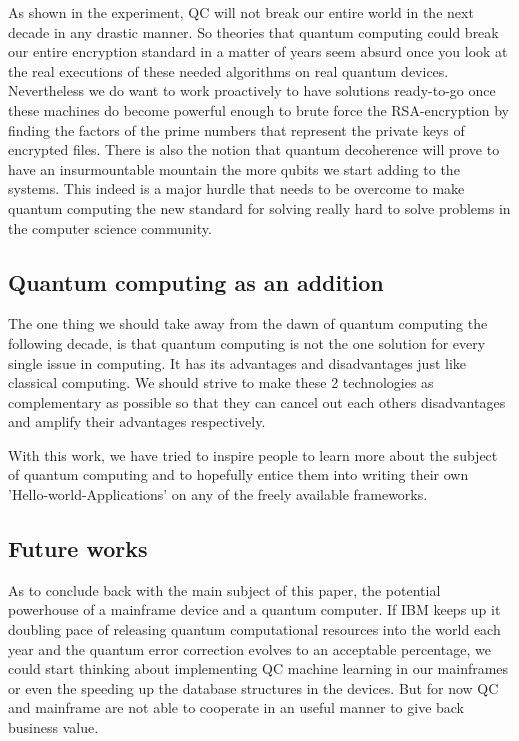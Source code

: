 As shown in the experiment, QC will not break our entire world in the next decade in any drastic manner. So theories that quantum computing could break our entire encryption standard in a matter of years seem absurd once you look at the real executions of these needed algorithms on real quantum devices.
Nevertheless we do want to work proactively to have solutions ready-to-go once these machines do become powerful enough to brute force the RSA-encryption by finding the factors of the prime numbers that represent the private keys of encrypted files.
There is also the notion that quantum decoherence will prove to have an insurmountable mountain the more qubits we start adding to the systems. This indeed is a major hurdle that needs to be overcome to make quantum computing the new standard for solving really hard to solve problems in the computer science community.

\subsection{Quantum computing as an addition}

The one thing we should take away from the dawn of quantum computing the following decade, is that quantum computing is not the one solution for every single issue in computing. It has its advantages and disadvantages just like classical computing. We should strive to make these 2 technologies as complementary as possible so that they can cancel out each others disadvantages and amplify their advantages respectively. 

With this work, we have tried to inspire people to learn more about the subject of quantum computing and to hopefully entice them into writing their own 'Hello-world-Applications' on any of the freely available frameworks.

\subsection{Future works}

As to conclude back with the main subject of this paper, the potential powerhouse of a mainframe device and a quantum computer. If IBM keeps up it doubling pace of releasing quantum computational resources into the world each year and the quantum error correction evolves to an acceptable percentage, we could start thinking about implementing QC machine learning in our mainframes or even the speeding up the database structures in the devices. But for now QC and mainframe are not able to cooperate in an useful manner to give back business value. 

